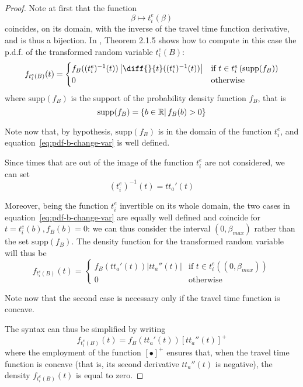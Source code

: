 \begin{proof}
  Note at first that the function
  \begin{equation*}
    \beta \mapsto t_i^e(\beta)
  \end{equation*}
  coincides, on its domain,
with the inverse of the travel time function derivative, and is thus a bijection.
In \citet{casella2001statistical}, Theorem 2.1.5 shows how to compute in this case the p.d.f. of the transformed random variable \(t_i^e(B)\):
\begin{equation}
  \label{eq:pdf-b-change-var}
  f_{t_i^e(B)}(t) =
  \begin{cases}
    f_B((t_i^e)^{-1}(t)) \left| \diff{}{t}((t_i^e)^{-1}(t)) \right| & \text{if } t \in t_i^e\left(\text{supp}(f_B)\right) \\
    0 & \text{otherwise}
  \end{cases}
\end{equation}
where \(\text{supp}(f_B)\) is the support of the probability density function \(f_B\), that is
\begin{equation*}
  \text{supp}(f_B) = \{b \in \mathbb{R} |\, f_B(b) > 0 \}
\end{equation*}

Note now that, by hypothesis,
\(\text{supp}(f_B)\) is in the domain of the function \(t_i^e\),
and equation~\eqref{eq:pdf-b-change-var} is well defined.

Since times that are out of the image of the function \(t_i^e\) are not considered,
we can set
\begin{equation*}
  (t_i^e)^{-1}(t) = tt_a'(t)
\end{equation*}

Moreover, being the function \(t_i^e\) invertible on its whole domain,
the two cases in equation~\eqref{eq:pdf-b-change-var} are equally well defined and coincide for \(t = t_i^e(b), f_B(b) = 0\):
we can thus consider the interval \((0, \beta_{max})\) rather than the set \(\text{supp}(f_B)\).
The density function for the transformed random variable will thus be
\begin{equation*}
  f_{t_i^e(B)}(t) =
  \begin{cases}
    f_B(tt_a'(t)) \left|tt_a''(t)\right| & \text{if } t \in t_i^e\left((0, \beta_{max})\right) \\
    0 & \text{otherwise}
  \end{cases}
\end{equation*}

Note now that the second case is necessary only if the travel time function is concave.

The syntax can thus be simplified by writing
\begin{equation*}
  f_{t_i^e(B)}(t) = f_B(tt_a'(t)) [tt_a''(t)]^+
\end{equation*}
where the employment of the function \([\bullet]^+\) ensures that,
when the travel time function is concave (that is, its second derivative \(tt_a''(t)\) is negative),
the density \(f_{t_i^e(B)}(t)\) is equal to zero.
\end{proof}


